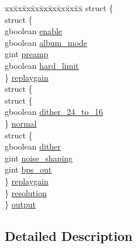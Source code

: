 \begin{DoxyCompactItemize}
\begin{tabbing}
\end{tabbing}\item 
\begin{tabbing}
xx\=xx\=xx\=xx\=xx\=xx\=xx\=xx\=xx\=\kill
struct \{\\
\>struct \{\\
\>\>gboolean \hyperlink{structflac__config__t_a99896bcdb5bb9077da5a77e25ae4df38}{enable}\\
\>\>gboolean \hyperlink{structflac__config__t_a5a4d3eadffdd5ffa124b640de5abba0d}{album\_mode}\\
\>\>gint \hyperlink{structflac__config__t_acc866fd2bebd66234416b63369f2485e}{preamp}\\
\>\>gboolean \hyperlink{structflac__config__t_a9800e70f1e92d27c87a5de2e9d9aaffd}{hard\_limit}\\
\>\} \hyperlink{structflac__config__t_a8299a783d577ee4210624553de3ffcec}{replaygain}\\
\>struct \{\\
\>\>struct \{\\
\>\>\>gboolean \hyperlink{structflac__config__t_a4cfb5038eee0428baced32376eb43abb}{dither\_24\_to\_16}\\
\>\>\} \hyperlink{structflac__config__t_a0d1d1052e00b2dc22a7842bfc6cf5c73}{normal}\\
\>\>struct \{\\
\>\>\>gboolean \hyperlink{structflac__config__t_a7652cb64a3710dc3b4b58d98a4f540d2}{dither}\\
\>\>\>gint \hyperlink{structflac__config__t_ac8104f41b8ade34269dbb970b33938d7}{noise\_shaping}\\
\>\>\>gint \hyperlink{structflac__config__t_a46db567559c134976cfa381752c70040}{bps\_out}\\
\>\>\} \hyperlink{structflac__config__t_a86703621fa9c12a8d844c2606897da38}{replaygain}\\
\>\} \hyperlink{structflac__config__t_a2cd35a654e1ce8275382918976c9e3e0}{resolution}\\
\} \hyperlink{structflac__config__t_a1088ee5804cf7507603775f781404480}{output}\\

\end{tabbing}\end{DoxyCompactItemize}


\subsection{Detailed Description}



